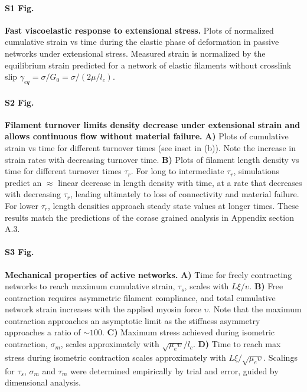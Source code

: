 \documentclass[10pt,letterpaper]{article}
\begin{document}
\paragraph*{S1 Fig.}
\label{fig:passive_supp}
{\bf  Fast viscoelastic response to extensional stress.}  Plots of normalized cumulative strain vs time during the elastic phase of deformation in passive networks under extensional stress.  Measured strain is normalized by the equilibrium strain predicted for a network of elastic filaments without crosslink slip $\gamma_{eq} = \sigma/G_0 = \sigma/(2\mu/l_c)$.  


\paragraph*{S2 Fig.}
\label{fig:thinning}
{\bf  Filament turnover limits density decrease under extensional strain and allows continuous flow without material failure.} \textbf{A)} Plots of cumulative strain vs time for different turnover times (see inset in (b)). Note the increase in strain rates with decreasing turnover time. \textbf{B)} Plots of filament length density vs time for different turnover times $\tau_r$.  For long to intermediate $\tau_r$, simulations predict an $\approx$ linear decrease in length density with time, at a rate that decreases with decreasing $\tau_r$, leading ultimately to loss of connectivity and material failure. For lower $\tau_r$, length densities approach steady state values at longer times. These results match the predictions of the corase grained analysis in Appendix section A.3.

\paragraph*{S3 Fig.}
\label{fig:active_supp}
{\bf  Mechanical properties of active networks.}  \textbf{A)}  Time for freely contracting networks to reach maximum cumulative strain, $\tau_s$, scales with $L\xi/\upsilon$.  \textbf{B)} Free contraction requires asymmetric filament compliance, and total cumulative network strain increases with the applied myosin force $\upsilon$. Note that the maximum contraction approaches an asymptotic limit as the stiffness asymmetry approaches a ratio of $\sim 100$.   \textbf{C)}  Maximum stress achieved during isometric contraction, $\sigma_m$, scales approximately with $\sqrt{\mu_e\upsilon}/l_c$.  \textbf{D)} Time to reach max stress during isometric contraction scales approximately with $L\xi/\sqrt{\mu_e\upsilon}$. Scalings for $\tau_s$, $\sigma_m$ and $\tau_m$ were determined empirically by trial and error, guided by dimensional analysis.  
\end{document}
